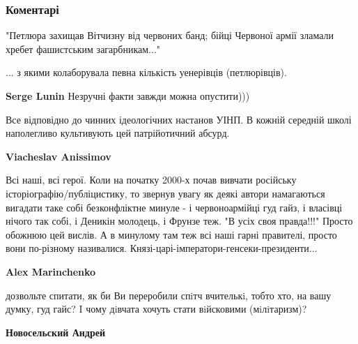  
 
 
 
 
\subsubsection{Коментарі}
\label{sec:17_10_2021.fb.marinchenko_aleksandr.1.diorama_deti_ideologia_komsomol.cmt}

\begin{itemize} %

"Петлюра захищав Вітчизну від червоних банд; бійці Червоної армії зламали
хребет фашистським загарбникам..."

... з якими колаборувала певна кількість уенерівців (петлюрівців).

\begin{itemize} %
\textbf{Serge Lunin} Незручні факти завжди можна опустити)))
\end{itemize} %


Все відповідно до чинних ідеологічних настанов УІНП. В кожній середній школі
наполегливо культивують цей патрійотичний абсурд.

\begin{itemize} %
\textbf{Viacheslav Anissimov} 

Всі наші, всі герої. Коли на початку 2000-х почав вивчати російську
історіографію/публіцистику, то звернув увагу як деякі автори намагаються
вигадати таке собі безконфліктне минуле - і червоноармійці гуд гайз, і власівці
нічого так собі, і Деникін молодець, і Фрунзе теж. "В усіх своя правда!!!"
Просто обожнюю цей вислів. А в минулому там теж всі наші гарні правителі,
просто вони по-різному називалися. Князі-царі-імператори-генсеки-президенти...

\textbf{Alex Marinchenko} 

дозвольте спитати, як би Ви переробили спiтч вчителькi, тобто хто, на вашу
думку, гуд гайс? I чому дiвчата хочуть стати вiйсковими (мiлiтаризм)?


\textbf{Новосельский Андрей} 


\end{itemize}
\end{itemize}
